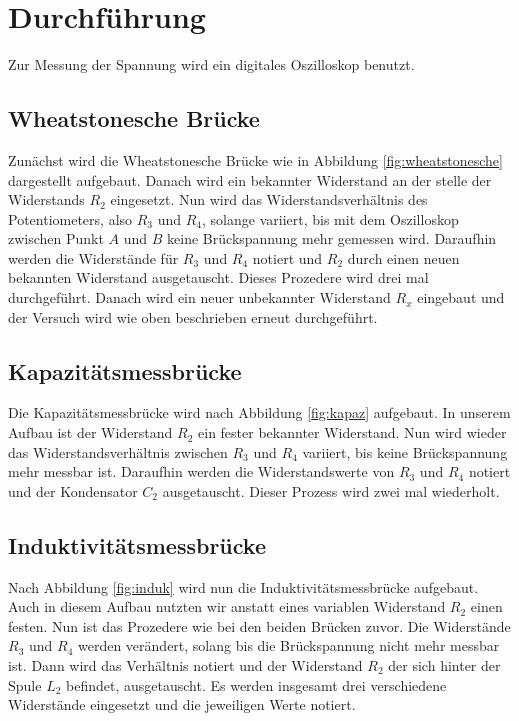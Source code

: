 \section{Durchführung}
\label{sec:Durchführung}

Zur Messung der Spannung wird ein digitales Oszilloskop benutzt.

\subsection{Wheatstonesche Brücke}

Zunächst wird die Wheatstonesche Brücke wie in Abbildung \ref{fig:wheatstonesche} dargestellt aufgebaut.
Danach wird ein bekannter Widerstand an der stelle der Widerstands $R_2$ eingesetzt.
Nun wird das Widerstandsverhältnis des Potentiometers, also $R_3$ und $R_4$, solange variiert, bis mit dem Oszilloskop zwischen Punkt $A$ und $B$ keine Brückspannung mehr gemessen wird.
Daraufhin werden die Widerstände für $R_3$ und $R_4$ notiert und $R_2$ durch einen neuen bekannten Widerstand ausgetauscht.
Dieses Prozedere wird drei mal durchgeführt.
Danach wird ein neuer unbekannter Widerstand $R_x$ eingebaut und der Versuch wird wie oben beschrieben erneut durchgeführt.

\subsection{Kapazitätsmessbrücke}

Die Kapazitätsmessbrücke wird nach Abbildung \ref{fig:kapaz} aufgebaut.
In unserem Aufbau ist der Widerstand $R_2$ ein fester bekannter Widerstand.
Nun wird wieder das Widerstandsverhältnis zwischen $R_3$ und $R_4$ variiert, bis keine Brückspannung mehr messbar ist.
Daraufhin werden die Widerstandswerte von $R_3$ und $R_4$ notiert und der Kondensator $C_2$ ausgetauscht.
Dieser Prozess wird zwei mal wiederholt.

\subsection{Induktivitätsmessbrücke}

Nach Abbildung \ref{fig:induk} wird nun die Induktivitätsmessbrücke aufgebaut.
Auch in diesem Aufbau nutzten wir anstatt eines variablen Widerstand $R_2$ einen festen.
Nun ist das Prozedere wie bei den beiden Brücken zuvor. Die Widerstände $R_3$ und $R_4$ werden verändert, solang bis die Brückspannung nicht mehr messbar ist.
Dann wird das Verhältnis notiert und der Widerstand $R_2$ der sich hinter der Spule $L_2$ befindet, ausgetauscht.
Es werden insgesamt drei verschiedene Widerstände eingesetzt und die jeweiligen Werte notiert.

